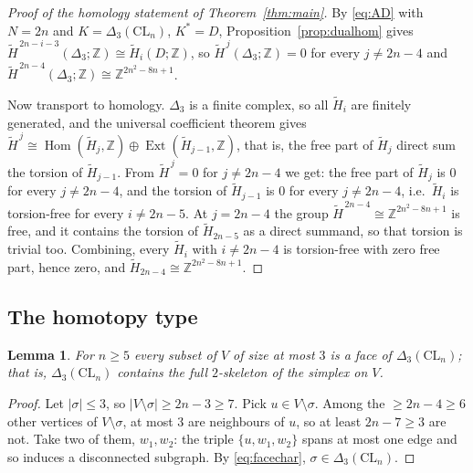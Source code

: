 \documentclass[11pt]{amsart}
\newtheorem{lemma}[theorem]{Lemma}
\theoremstyle{definition}
\newcommand{\CL}{\mathrm{CL}}
\newcommand{\Dl}{\Delta}
\newcommand{\Zm}{\mathbb{Z}}
\begin{document}
\begin{proof}[Proof of the homology statement of Theorem~\ref{thm:main}]
By \eqref{eq:AD} with $N=2n$ and $K=\Dl_3(\CL_n)$, $K^{*}=D$, Proposition~\ref{prop:dualhom} gives
$\widetilde H^{\,2n-i-3}(\Dl_3;\Zm)\cong\widetilde H_i(D;\Zm)$, so
$\widetilde H^{\,j}(\Dl_3;\Zm)=0$ for every $j\ne2n-4$ and
$\widetilde H^{\,2n-4}(\Dl_3;\Zm)\cong\Zm^{2n^2-8n+1}$.

Now transport to homology. $\Dl_3$ is a finite complex, so all $\widetilde H_i$ are finitely
generated, and the universal coefficient theorem gives
$\widetilde H^{\,j}\cong\operatorname{Hom}(\widetilde H_j,\Zm)\oplus\operatorname{Ext}(\widetilde
H_{j-1},\Zm)$, that is, the free part of $\widetilde H_j$ direct sum the torsion of
$\widetilde H_{j-1}$. From $\widetilde H^{\,j}=0$ for $j\ne2n-4$ we get: the free part of
$\widetilde H_j$ is $0$ for every $j\ne2n-4$, and the torsion of $\widetilde H_{j-1}$ is $0$ for
every $j\ne2n-4$, i.e.\ $\widetilde H_i$ is torsion-free for every $i\ne2n-5$. At $j=2n-4$ the group
$\widetilde H^{\,2n-4}\cong\Zm^{2n^2-8n+1}$ is free, and it contains the torsion of
$\widetilde H_{2n-5}$ as a direct summand, so that torsion is trivial too. Combining, every
$\widetilde H_i$ with $i\ne2n-4$ is torsion-free with zero free part, hence zero, and
$\widetilde H_{2n-4}\cong\Zm^{2n^2-8n+1}$.
\end{proof}

\subsection{The homotopy type}

\begin{lemma}\label{lem:skel}
For $n\ge5$ every subset of $V$ of size at most $3$ is a face of $\Dl_3(\CL_n)$; that is,
$\Dl_3(\CL_n)$ contains the full $2$-skeleton of the simplex on $V$.
\end{lemma}

\begin{proof}
Let $|\sigma|\le3$, so $|V\setminus\sigma|\ge2n-3\ge7$. Pick $u\in V\setminus\sigma$. Among the
$\ge2n-4\ge6$ other vertices of $V\setminus\sigma$, at most $3$ are neighbours of $u$, so at least
$2n-7\ge3$ are not. Take two of them, $w_1,w_2$: the triple $\{u,w_1,w_2\}$ spans at most one edge
and so induces a disconnected subgraph. By \eqref{eq:facechar}, $\sigma\in\Dl_3(\CL_n)$.
\end{proof}
\end{document}
